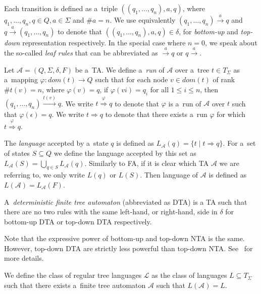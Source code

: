 Each transition is defined as a~triple $((q_1,\ldots,q_n), a, q)$, where
$q_1,\ldots,q_n,q \in Q, a \in \Sigma$ and $\#a = n$. We use equivalently
$(q_1,\ldots,q_n) \overset{a}{\longrightarrow} q$ and $q
\overset{a}{\longrightarrow}  (q_1,\ldots,q_n)$ to denote that
$((q_1,\ldots,q_n), a, q) \in \delta$, for \emph{bottom-up} and \emph{top-down}
representation respectively. In the special case where $n = 0$, we speak about
the so-called \emph{leaf rules} that can be abbreviated as
$\overset{a}{\longrightarrow}  q$ or $q \overset{a}{\longrightarrow} $.

Let $\mathcal{A} = (Q, \Sigma, \delta, F)$ be a~TA. We define a~\emph{run} of
$\mathcal{A}$ over a~tree $t \in T_\Sigma$ as a~mapping $\varphi: dom(t) \to Q$
such that for each node $v \in dom(t)$ of rank $\#t(v) = n$, where $\varphi(v) =
q$, if $\varphi(vi) = q_i$ for all $1 \leq i \leq n$, then $(q_1,\ldots,q_n)
\overset{t(v)}{\longrightarrow} q$. We write $t
\overset{\varphi}{\Longrightarrow} q$ to denote that $\varphi$ is a~run of
$\mathcal{A}$ over $t$ such that $\varphi(\epsilon) = q$. We write $t
\Longrightarrow q$ to denote that there exists a~run $\varphi$ for which $t
\overset{\varphi}{\Longrightarrow} q$.

The \emph{language} accepted by a~state $q$ is defined as $L_{\mathcal{A}}(q) =
\{t \mid t \Longrightarrow q\}$. For a~set of states $S \subseteq Q$ we define
the language accepted by this set as $L_{\mathcal{A}}(S) = \bigcup_{q \in S}
L_{\mathcal{A}}(q)$. Similarly to FA, if it is clear which TA $\mathcal{A}$ we
are referring to, we only write $L(q)$ or $L(S)$. Then language of $\mathcal{A}$
is defined as $L(\mathcal{A}) = L_{\mathcal{A}}(F)$.

\begin{defz}
A~\emph{deterministic finite tree automaton} (abbreviated as DTA) is a
TA such that there are no two rules with the
same left-hand, or right-hand, side in $\delta$ for bottom-up DTA or top-down
DTA respectively.
\end{defz}

Note that the expressive power of bottom-up and top-down NTA is the same.
However, top-down DTA are strictly less powerful than top-down NTA.
See~\cite{tata} for more details.

\begin{defz}
We define the class of regular tree languages $\mathcal{L}$ as the class of
languages $L \subseteq T_\Sigma$ such that there exists a~finite tree automaton
$\mathcal{A}$ such that $L(\mathcal{A}) = L$.
\end{defz}

